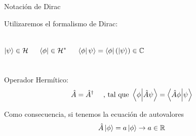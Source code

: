 \begin{frame}{Notación de Dirac}

	Utilizaremos el formalismo de Dirac:
	
    \begin{columns}[c]
        \[
			\ket{\psi} \in \mathcal{H}
        \]

        \[
            \bra{\phi} \in \mathcal{H}^*
        \]

        \[
			\bra{\phi}  \psi \rangle = \bra{\phi} \left( \ket{\psi} \right) \in \mathbb{C}
        \]
    \end{columns}

	Operador Hermítico:
	\[
		\hat{A}= \hat{A}^\dagger \quad \text{	, tal que } \braket{\phi}{\hat{A} \psi} = \braket{ \hat{A}\phi}{\psi} 
	\]
	
	Como consecuencia, si tenemos la ecuación de autovalores
	\[
		\hat{A}\ket\phi = a \ket\phi \rightarrow a\in\mathbb{R}
	\]
	

\end{frame}
